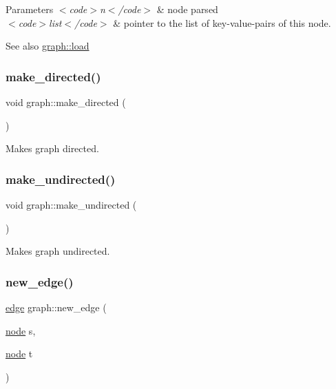 \begin{DoxyParams}{Parameters}
{\em $<$code$>$n$<$/code$>$} & node parsed \\
\hline
{\em $<$code$>$list$<$/code$>$} & pointer to the list of key-\/value-\/pairs of this node. \\
\hline
\end{DoxyParams}
\begin{DoxySeeAlso}{See also}
\mbox{\hyperlink{classgraph_a35749ff66d1acd6bbef9852df4f39c95}{graph\+::load}} 
\end{DoxySeeAlso}
\mbox{\label{classgraph_a1615678dee6248d6d8a00c553770b3bd}} 
\subsubsection{\texorpdfstring{make\+\_\+directed()}{make\_directed()}}
{\footnotesize\ttfamily void graph\+::make\+\_\+directed (\begin{DoxyParamCaption}{ }\end{DoxyParamCaption})}

Makes graph directed. \mbox{\label{classgraph_a31c8b895bd842f1b9dcc67649956cfc7}} 
\subsubsection{\texorpdfstring{make\+\_\+undirected()}{make\_undirected()}}
{\footnotesize\ttfamily void graph\+::make\+\_\+undirected (\begin{DoxyParamCaption}{ }\end{DoxyParamCaption})}

Makes graph undirected. \mbox{\label{classgraph_a02a0c3a219f75d68caa408ef339d4a1c}} 
\subsubsection{\texorpdfstring{new\+\_\+edge()}{new\_edge()}}
{\footnotesize\ttfamily \mbox{\hyperlink{classedge}{edge}} graph\+::new\+\_\+edge (\begin{DoxyParamCaption}\item[{\mbox{\hyperlink{classnode}{node}}}]{s,  }\item[{\mbox{\hyperlink{classnode}{node}}}]{t }\end{DoxyParamCaption})\hspace{0.3cm}{\ttfamily [virtual]}}

